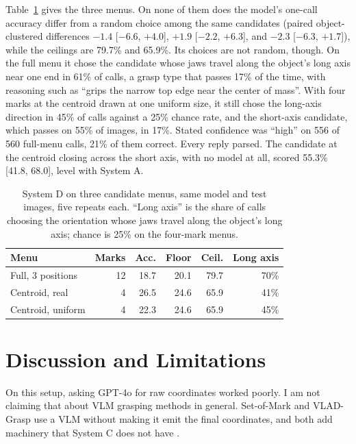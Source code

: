 \documentclass[10pt,conference,compsoc]{IEEEtran}
\begin{document}
Table~\ref{tab:menus} gives the three menus. On none of them does the
model's one-call accuracy differ from a random choice among the same
candidates (paired object-clustered differences $-1.4$ [$-6.6$, $+4.0$],
$+1.9$ [$-2.2$, $+6.3$], and $-2.3$ [$-6.3$, $+1.7$]), while the ceilings
are 79.7\% and 65.9\%. Its choices are not random, though. On the full
menu it chose the candidate whose jaws travel along the object's long axis
near one end in 61\% of calls, a grasp type that passes 17\% of the time,
with reasoning such as ``grips the narrow top edge near the center of
mass''. With four marks at the centroid drawn at one uniform size, it still
chose the long-axis direction in 45\% of calls against a 25\% chance rate,
and the short-axis candidate, which passes on 55\% of images, in 17\%.
Stated confidence was ``high'' on 556 of 560 full-menu calls, 21\% of them
correct. Every reply parsed. The candidate at the centroid closing across
the short axis, with no model at all, scored 55.3\% [41.8, 68.0], level
with System A.

\begin{table}[t]
\caption{System D on three candidate menus, same model and test images,
five repeats each. ``Long axis'' is the share of calls choosing the
orientation whose jaws travel along the object's long axis; chance is 25\%
on the four-mark menus.}
\label{tab:menus}
\centering
\footnotesize
\begin{tabular}{lrrrrr}
\toprule
Menu & Marks & Acc. & Floor & Ceil. & Long axis \\
\midrule
Full, 3 positions & 12 & 18.7 & 20.1 & 79.7 & 70\% \\
Centroid, real & 4 & 26.5 & 24.6 & 65.9 & 41\% \\
Centroid, uniform & 4 & 22.3 & 24.6 & 65.9 & 45\% \\
\bottomrule
\end{tabular}
\end{table}

\section{Discussion and Limitations}

On this setup, asking GPT-4o for raw coordinates worked poorly. I am not
claiming that about VLM grasping methods in general. Set-of-Mark and VLAD-Grasp
use a VLM without making it emit the final coordinates, and both add machinery
that System C does not have \cite{yang2024,kulshrestha2025}.
\end{document}
